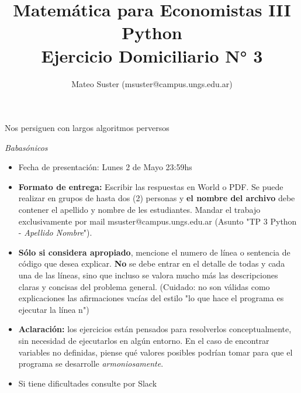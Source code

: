\documentclass{article}
\title{Matemática para Economistas III \\ Python \\ Ejercicio Domiciliario N° 3}
\author{Mateo Suster (msuster@campus.ungs.edu.ar)}
\begin{document}
\maketitle
\setlength{\epigraphwidth}{0.55\textwidth}
\epigraph{Nos persiguen con largos algoritmos perversos}{\textit{Babasónicos}}

\begin{itemize}
	\item Fecha de presentación: Lunes 2 de Mayo 23:59hs
    \item \textbf{Formato de entrega:} Escribir las respuestas en World o PDF. Se puede realizar en grupos de hasta dos (2) personas y \textbf{el nombre del archivo} debe contener el apellido y nombre de les estudiantes. Mandar el trabajo exclusivamente por mail msuster@campus.ungs.edu.ar (Asunto "TP 3 Python - \emph{Apellido Nombre}"). 
    \item \textbf{Sólo si considera apropiado}, mencione el numero de línea o sentencia de código que desea explicar. \textbf{No} se debe entrar en el detalle de todas y cada una de las líneas, sino que incluso se valora mucho más las descripciones claras y concisas del problema general. (Cuidado: no son válidas como explicaciones las afirmaciones vacías del estilo "lo que hace el programa es ejecutar la línea n")
    \item \textbf{Aclaración:} los ejercicios están pensados para resolverlos conceptualmente, sin necesidad de ejecutarlos en algún entorno. En el caso de encontrar variables no definidas, piense qué valores posibles podrían tomar para que el programa se desarrolle \emph{armoniosamente}.
    \item Si tiene dificultades consulte por Slack
\end{itemize}

%    
%
%    
%        
\end{document}
